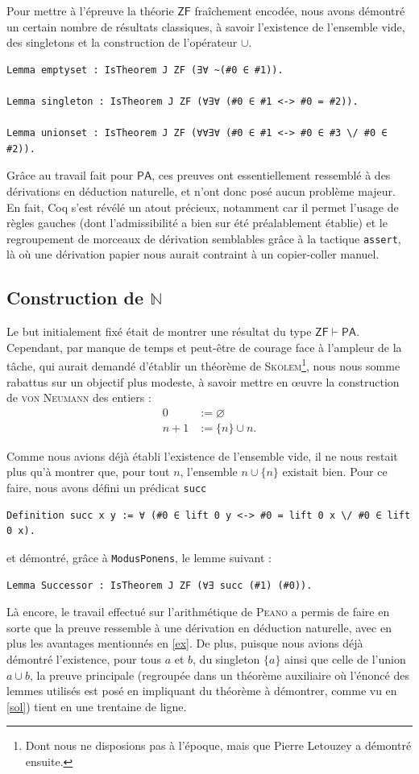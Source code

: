 \documentclass[a4paper]{article}
\newcommand{\N}{\ensuremath{\mathbb{N}}}
\newcommand{\PA}{\mathsf{PA}}
\newcommand{\ZF}{\mathsf{ZF}}
\theoremstyle{remark}
\theoremstyle{remark}
\theoremstyle{remark}
\theoremstyle{definition}
\theoremstyle{definition}
\theoremstyle{definition}
\begin{document}
Pour mettre à l'épreuve la théorie $\ZF$ fraîchement encodée, nous avons démontré un certain nombre de résultats classiques, à savoir l'existence de l'ensemble vide, des singletons et la construction de l'opérateur $\cup$.
\begin{verbatim}
Lemma emptyset : IsTheorem J ZF (∃∀ ~(#0 ∈ #1)).

Lemma singleton : IsTheorem J ZF (∀∃∀ (#0 ∈ #1 <-> #0 = #2)).

Lemma unionset : IsTheorem J ZF (∀∀∃∀ (#0 ∈ #1 <-> #0 ∈ #3 \/ #0 ∈ #2)).
\end{verbatim}

Grâce au travail fait pour $\PA$, ces preuves ont essentiellement ressemblé à des dérivations en déduction naturelle, et n'ont donc posé aucun problème majeur. En fait, Coq s'est révélé un atout précieux, notamment car il permet l'usage de règles gauches (dont l'admissibilité a bien sur été préalablement établie) et le regroupement de morceaux de dérivation semblables grâce à la tactique \verb+assert+, là où une dérivation papier nous aurait contraint à un copier-coller manuel.

\subsection{Construction de $\N$}

Le but initialement fixé était de montrer une résultat du type $\ZF \vdash \PA$. Cependant, par manque de temps et peut-être de courage face à l'ampleur de la tâche, qui aurait demandé d'établir un théorème de \textsc{Skolem}\footnote{Dont nous ne disposions pas à l'époque, mais que Pierre Letouzey a démontré ensuite.}, nous nous somme rabattus sur un objectif plus modeste, à savoir mettre en \oe uvre la construction de \textsc{von Neumann} des entiers :
\begin{align*}
0 &:= \varnothing \\
n + 1 &:= \{ n \} \cup n.
\end{align*}

Comme nous avions déjà établi l'existence de l'ensemble vide, il ne nous restait plus qu'à montrer que, pour tout $n$, l'ensemble $n \cup \{ n \}$ existait bien. Pour ce faire, nous avons défini un prédicat \verb+succ+
\begin{verbatim}
Definition succ x y := ∀ (#0 ∈ lift 0 y <-> #0 = lift 0 x \/ #0 ∈ lift 0 x).
\end{verbatim}
et démontré, grâce à \verb+ModusPonens+, le lemme suivant :
\begin{verbatim}
Lemma Successor : IsTheorem J ZF (∀∃ succ (#1) (#0)).
\end{verbatim}
Là encore, le travail effectué sur l'arithmétique de \textsc{Peano} a permis de faire en sorte que la preuve ressemble à une dérivation en déduction naturelle, avec en plus les avantages mentionnés en \ref{ex}. De plus, puisque nous avions déjà démontré l'existence, pour tous $a$ et $b$, du singleton $\{ a \}$ ainsi que celle de l'union $a \cup b$, la preuve principale (regroupée dans un théorème auxiliaire où l'énoncé des lemmes utilisés est posé en impliquant du théorème à démontrer, comme vu en \ref{sol}) tient en une trentaine de ligne.
\end{document}
